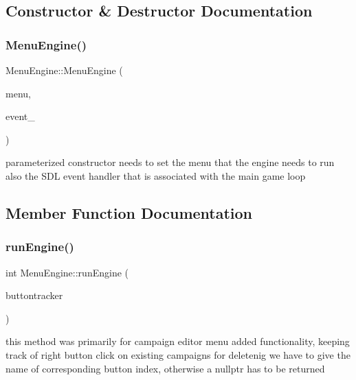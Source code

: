 \subsection{Constructor \& Destructor Documentation}
\hypertarget{class_menu_engine_a73e9b1c7c061c19862853069466c5f28}{}\label{class_menu_engine_a73e9b1c7c061c19862853069466c5f28} 
\subsubsection{\texorpdfstring{Menu\+Engine()}{MenuEngine()}}
{\footnotesize\ttfamily Menu\+Engine\+::\+Menu\+Engine (\begin{DoxyParamCaption}\item[{\hyperlink{class_menus}{Menus} $\ast$}]{menu,  }\item[{S\+D\+L\+\_\+\+Event}]{event\+\_\+ }\end{DoxyParamCaption})}

parameterized constructor needs to set the menu that the engine needs to run also the S\+DL event handler that is associated with the main game loop 

\subsection{Member Function Documentation}
\hypertarget{class_menu_engine_a3451ff9a6fd653ac8c14bdb243fb4dbd}{}\label{class_menu_engine_a3451ff9a6fd653ac8c14bdb243fb4dbd} 
\subsubsection{\texorpdfstring{run\+Engine()}{runEngine()}\hspace{0.1cm}{\footnotesize\ttfamily [1/2]}}
{\footnotesize\ttfamily int Menu\+Engine\+::run\+Engine (\begin{DoxyParamCaption}\item[{char $\ast$}]{buttontracker }\end{DoxyParamCaption})}

this method was primarily for campaign editor menu added functionality, keeping track of right button click on existing campaigns for deletenig we have to give the name of corresponding button index, otherwise a nullptr has to be returned \hypertarget{class_menu_engine_a3892d4815765b63648789bcfe28ca729}{}\label{class_menu_engine_a3892d4815765b63648789bcfe28ca729} 
